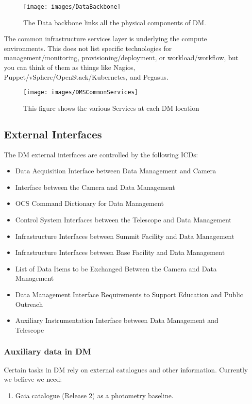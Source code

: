 \begin{figure}[htbp]
\begin{center}
 \texttt{[image: images/DataBackbone]}
\caption{The Data backbone links all the physical components of DM. \label{fig:databb}}
\end{center}
\end{figure}

The common infrastructure services layer is underlying the compute environments. 
This does not list  specific technologies for management/monitoring,
provisioning/deployment, or workload/workflow, but you can think of them
as things like Nagios, Puppet/vSphere/OpenStack/Kubernetes, and Pegasus.

\begin{figure}[htbp]
\begin{center}
 \texttt{[image: images/DMSCommonServices]}
\caption{This figure shows the various Services at each DM location \label{fig:dcs}}
\end{center}
\end{figure}



\subsection{External Interfaces}
The DM external interfaces are controlled by the following ICDs:
\begin{itemize}
	\item[\citeds{LSE-68}] Data Acquisition Interface between Data Management and Camera
	\item[\citeds{LSE-69}] Interface between the Camera and Data Management	 
	\item[\citeds{LSE-72}] OCS Command Dictionary for Data Management
	\item[\citeds{LSE-75}] Control System Interfaces between the Telescope and Data Management
	\item[\citeds{LSE-76}] Infrastructure Interfaces between Summit Facility and Data Management
	\item[\citeds{LSE-77}] Infrastructure Interfaces between Base Facility and Data Management
	\item[\citeds{LSE-130}] List of Data Items to be Exchanged Between the Camera and Data Management
	\item[\citeds{LSE-131}] Data Management Interface Requirements to Support Education and Public Outreach 
	\item[\citeds{LSE-140}] Auxiliary Instrumentation Interface between Data Management and Telescope
\end{itemize}

\subsubsection{Auxiliary data in DM}
Certain tasks in DM rely on external catalogues and other information. Currently we believe we need:
\begin{enumerate}
		        \item Gaia catalogue (Release 2) as a photometry baseline.
		\end{enumerate}
